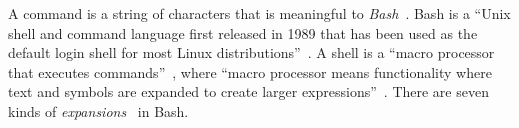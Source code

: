 A command is a string of characters that is meaningful to \emph{Bash}~\cite{gnu_bash}. Bash is a \enquote{Unix shell and command language first released in 1989 that has been used as the default login shell for most Linux distributions}~\cite{bash}. A shell is a \enquote{macro processor that executes commands}~\cite{bash_manual}, where \enquote{macro processor means functionality where text and symbols are expanded to create larger expressions}~\cite{bash_manual}. There are seven kinds of \emph{expansions}~\cite{bash_expansions_ref} in Bash.



